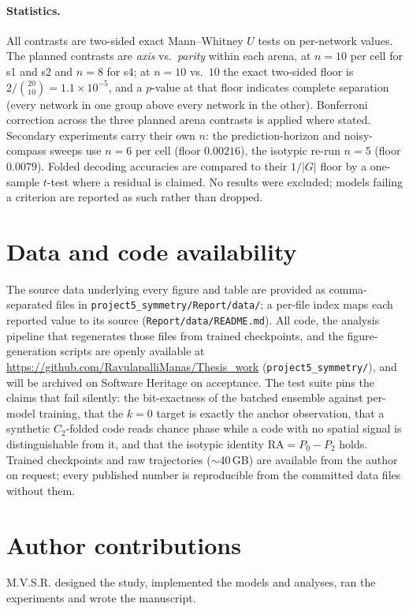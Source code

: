 \documentclass[9pt,lineno]{elife}
\begin{document}
\paragraph{Statistics.} All contrasts are two-sided exact Mann--Whitney $U$ tests on per-network
values. The planned contrasts are \textit{axis} vs.\ \textit{parity} within each arena, at
$n = 10$ per cell for s1 and s2 and $n = 8$ for s4; at $n = 10$ vs.\ $10$ the exact two-sided
floor is $2/\binom{20}{10} = 1.1\times10^{-5}$, and a $p$-value at that floor indicates complete
separation (every network in one group above every network in the other). Bonferroni correction
across the three planned arena contrasts is applied where stated. Secondary experiments carry
their own $n$: the prediction-horizon and noisy-compass sweeps use $n = 6$ per cell (floor
$0.00216$), the isotypic re-run $n = 5$ (floor $0.0079$). Folded decoding accuracies are compared
to their $1/|G|$ floor by a one-sample $t$-test where a residual is claimed. No results were
excluded; models failing a criterion are reported as such rather than dropped.

\section*{Data and code availability}

The source data underlying every figure and table are provided as comma-separated files in
\texttt{project5\_symmetry/Report/data/}; a per-file index maps each reported value to its
source (\texttt{Report/data/README.md}). All code, the analysis pipeline that regenerates those
files from trained checkpoints, and the figure-generation scripts are openly available at
\url{https://github.com/RavulapalliManas/Thesis_work} (\texttt{project5\_symmetry/}), and will
be archived on Software Heritage on acceptance. The test suite pins the claims that fail
silently: the bit-exactness of the batched ensemble against per-model training, that the $k=0$
target is exactly the anchor observation, that a synthetic $C_2$-folded code reads chance phase
while a code with no spatial signal is distinguishable from it, and that the isotypic identity
$\mathrm{RA} = P_0 - P_2$ holds. Trained checkpoints and raw trajectories ($\sim$40\,GB) are
available from the author on request; every published number is reproducible from the committed
data files without them.

\section*{Author contributions}
M.V.S.R. designed the study, implemented the models and analyses, ran the experiments and wrote
the manuscript.
\end{document}
